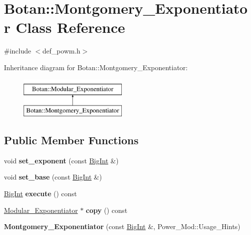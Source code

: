 \hypertarget{classBotan_1_1Montgomery__Exponentiator}{\section{Botan\-:\-:Montgomery\-\_\-\-Exponentiator Class Reference}
\label{classBotan_1_1Montgomery__Exponentiator}
}


{\ttfamily \#include $<$def\-\_\-powm.\-h$>$}

Inheritance diagram for Botan\-:\-:Montgomery\-\_\-\-Exponentiator\-:\begin{figure}[H]
\begin{center}
\leavevmode
\includegraphics[height=2.000000cm]{classBotan_1_1Montgomery__Exponentiator}
\end{center}
\end{figure}
\subsection*{Public Member Functions}
\begin{DoxyCompactItemize}
\item 
\hypertarget{classBotan_1_1Montgomery__Exponentiator_ad74b50306a594a78b56f0dd5ba517d93}{void {\bfseries set\-\_\-exponent} (const \hyperlink{classBotan_1_1BigInt}{Big\-Int} \&)}\label{classBotan_1_1Montgomery__Exponentiator_ad74b50306a594a78b56f0dd5ba517d93}

\item 
\hypertarget{classBotan_1_1Montgomery__Exponentiator_af88e9f110de05da57622846c1bdc38bb}{void {\bfseries set\-\_\-base} (const \hyperlink{classBotan_1_1BigInt}{Big\-Int} \&)}\label{classBotan_1_1Montgomery__Exponentiator_af88e9f110de05da57622846c1bdc38bb}

\item 
\hypertarget{classBotan_1_1Montgomery__Exponentiator_a5487295eede4a5901d4ceeed4e00cc73}{\hyperlink{classBotan_1_1BigInt}{Big\-Int} {\bfseries execute} () const }\label{classBotan_1_1Montgomery__Exponentiator_a5487295eede4a5901d4ceeed4e00cc73}

\item 
\hypertarget{classBotan_1_1Montgomery__Exponentiator_ac035cb6d36172e3693283e59c5cc9dd3}{\hyperlink{classBotan_1_1Modular__Exponentiator}{Modular\-\_\-\-Exponentiator} $\ast$ {\bfseries copy} () const }\label{classBotan_1_1Montgomery__Exponentiator_ac035cb6d36172e3693283e59c5cc9dd3}

\item 
\hypertarget{classBotan_1_1Montgomery__Exponentiator_a6ffe9ff12d0d44ec2960bab2e523c9f6}{{\bfseries Montgomery\-\_\-\-Exponentiator} (const \hyperlink{classBotan_1_1BigInt}{Big\-Int} \&, Power\-\_\-\-Mod\-::\-Usage\-\_\-\-Hints)}\label{classBotan_1_1Montgomery__Exponentiator_a6ffe9ff12d0d44ec2960bab2e523c9f6}

\end{DoxyCompactItemize}


